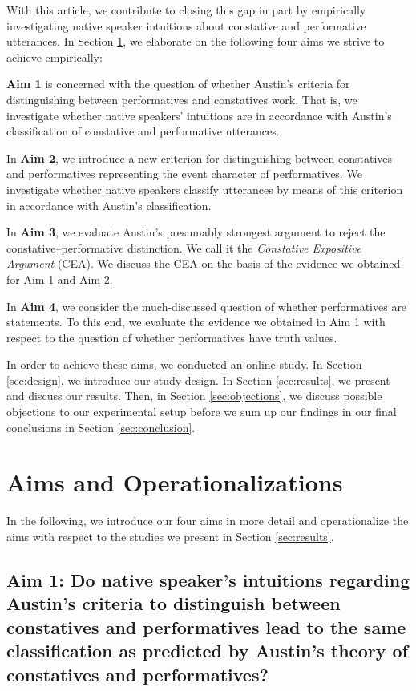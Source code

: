 \documentclass[egregdoesnotlikesansseriftitles,12pt]{scrartcl}
\begin{document}
With this article, we contribute to closing this gap in part by empirically investigating native speaker intuitions about constative and performative utterances. In Section \ref{sec:aims}, we elaborate on the following four aims we strive to achieve empirically:

\textbf{Aim 1} is concerned with the question of whether Austin's criteria for distinguishing between performatives and constatives work. That is, we investigate whether native speakers' intuitions are in accordance with Austin's classification of constative and performative utterances.

In \textbf{Aim 2}, we introduce a new criterion for distinguishing between constatives and performatives representing the event character of performatives. We investigate whether native speakers classify utterances by means of this criterion in accordance with Austin's classification.

In \textbf{Aim 3}, we evaluate Austin's presumably strongest argument to reject the constative--performative distinction. We call it the \textit{Constative Expositive Argument} (CEA). We discuss the CEA on the basis of the evidence we obtained for Aim 1 and Aim 2.

In \textbf{Aim 4}, we consider the much-discussed question of whether performatives are statements. To this end, we evaluate the evidence we obtained in Aim 1 with respect to the question of whether performatives have truth values.

In order to achieve these aims, we conducted an online study. In Section \ref{sec:design}, we introduce our study design. In Section \ref{sec:results}, we present and discuss our results. Then, in Section \ref{sec:objections}, we discuss possible objections to our experimental setup before we sum up our findings in our final conclusions in Section \ref{sec:conclusion}.


\section{Aims and Operationalizations}\label{sec:aims}
In the following, we introduce our four aims in more detail and operationalize the aims with respect to the studies we present in Section \ref{sec:results}.


\subsection{Aim 1: Do native speaker's intuitions regarding Austin's criteria to distinguish between constatives and performatives lead to the same classification as predicted by Austin's theory of constatives and performatives?}
\end{document}
